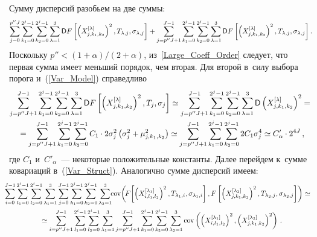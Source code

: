 Сумму дисперсий разобьем на две суммы:
\begin{equation*}
\sum\limits_{j = 0}^{p''J} \sum\limits_{k_1 = 0}^{2^j - 1}
\sum\limits_{k_2 = 0}^{2^j - 1}
\sum\limits_{\lambda=1}^3 {\sf D} F\left[\left(X_{j,k_1,k_2}^{[\lambda]}\right)^2,T_{\lambda,j},\sigma_{\lambda,j}\right]+
\sum\limits_{j = p''J + 1}^{J-1} \sum\limits_{k_1 = 0}^{2^j - 1}
\sum\limits_{k_2 = 0}^{2^j - 1}
\sum\limits_{\lambda=1}^3 {\sf D} F
\left[\left(X_{j,k_1,k_2}^{[\lambda]}\right)^2,T_{\lambda,j},\sigma_{\lambda,j}\right].
\end{equation*}
Поскольку $p''<(1+\alpha)/(2+\alpha)$, из~\eqref{Large_Coeff_Order}
следует, что первая сумма имеет меньший порядок, чем вторая. Для второй
в~силу выбора порога и~(\ref{Var_Model}) справедливо
\noindent
\begin{multline*}
\sum\limits_{j = p''J + 1}^{J - 1} \sum\limits_{k_1 = 0}^{2^j - 1}
\sum\limits_{k_2 = 0}^{2^j - 1} \sum_{\lambda=1}^3 {\sf D}
F\left[\left(X_{j,k_1,k_2}^{[\lambda]}\right)^2,T_j,\sigma_j\right]
\simeq \sum\limits_{j = p''J + 1}^{J - 1} \sum\limits_{k_1 = 0}^{2^j - 1}
\sum\limits_{k_2 = 0}^{2^j - 1}
\sum\limits_{\lambda=1}^3 {\sf D} \left(X_{j,k_1,k_2}^{[\lambda]}\right)^2={}
\\
{}=
\sum_{j = p''J + 1}^{J - 1} \sum_{k_1 = 0}^{2^j - 1}
\sum_{k_2 = 0}^{2^j - 1} C_1 \cdot2\sigma_j^2\left(\sigma_j^2 +\mu^2_{j,k_1,k_2}\right)
\simeq\sum\limits_{j = p''J + 1}^{J - 1} \sum\limits_{k_1 = 0}^{2^j - 1}
\sum\limits_{k_2 = 0}^{2^j - 1} 2C_1 \sigma_j^4
\simeq C'_\alpha \cdot2^{4J}\,,
\end{multline*}
где $C_1$ и~$C'_\alpha$~--- некоторые положительные константы.
%
Далее перейдем к~сумме ковариаций в~(\ref{Var_Struct}).
Аналогично сумме дисперсий имеем:
\begin{multline*}
\hspace*{-2.5mm}\sum\limits_{i = 0}^{J - 1} \sum\limits_{l_1 = 0}^{2^i - 1}
\sum\limits_{l_2 = 0}^{2^i - 1} \sum\limits_{\lambda_1=1}^3
\sum\limits_{j = 0}^{J - 1}\sum\limits_{k_1 = 0}^{2^j - 1}
\sum\limits_{k_2 = 0}^{2^j - 1}\sum\limits_{\lambda_2=1}^3\!\!
\cov\!\left(\!F\!\left[\left(X_{i,l_1,l_2}^{[\lambda_1]}\right)^2,
T_{\lambda_1,i},\sigma_{\lambda_1,i}
\vphantom{(X_{i,l_1,l_2}^{[\lambda_1]})^2}\right],
F\left[\left(X_{j,k_1,k_2}^{[\lambda_2]}\right)^2,T_{\lambda_2,j},\sigma_{\lambda_2,j}\right]\right)
\simeq {}\\
{}\simeq \sum\limits_{i = p''J + 1}^{J - 1} \sum\limits_{l_1 = 0}^{2^i - 1} \sum_{l_2 = 0}^{2^i - 1} \sum_{\lambda_1=1}^3\sum_{j = p''J + 1}^{J - 1}\sum_{k_1 = 0}^{2^j - 1} \sum_{k_2 = 0}^{2^j - 1}\sum_{\lambda_2=1}^3
\cov\left(\left(X_{i,l_1,l_2}^{[\lambda_1]}\right)^2,
\left(X_{j,k_1,k_2}^{[\lambda_2]}\right)^2\right)\,.
\end{multline*}
